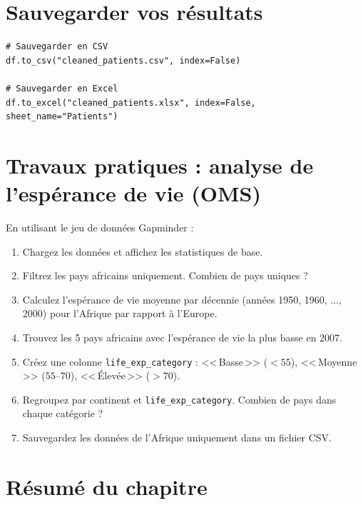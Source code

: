 \section{Sauvegarder vos r\'esultats}

\begin{verbatim}
# Sauvegarder en CSV
df.to_csv("cleaned_patients.csv", index=False)

# Sauvegarder en Excel
df.to_excel("cleaned_patients.xlsx", index=False, sheet_name="Patients")
\end{verbatim}

\section{Travaux pratiques : analyse de l'esp\'erance de vie (OMS)}

\begin{exercise}
En utilisant le jeu de donn\'ees Gapminder :
\begin{enumerate}
  \item Chargez les donn\'ees et affichez les statistiques de base.
  \item Filtrez les pays africains uniquement. Combien de pays uniques ?
  \item Calculez l'esp\'erance de vie moyenne par d\'ecennie (ann\'ees 1950, 1960, ..., 2000) pour l'Afrique par rapport \`a l'Europe.
  \item Trouvez les 5 pays africains avec l'esp\'erance de vie la plus basse en 2007.
  \item Cr\'eez une colonne \texttt{life\_exp\_category} : <<\,Basse\,>> ($<55$), <<\,Moyenne\,>> ($55$--$70$), <<\,\'Elev\'ee\,>> ($>70$).
  \item Regroupez par continent et \texttt{life\_exp\_category}. Combien de pays dans chaque cat\'egorie ?
  \item Sauvegardez les donn\'ees de l'Afrique uniquement dans un fichier CSV.
\end{enumerate}
\end{exercise}

\section{R\'esum\'e du chapitre}

